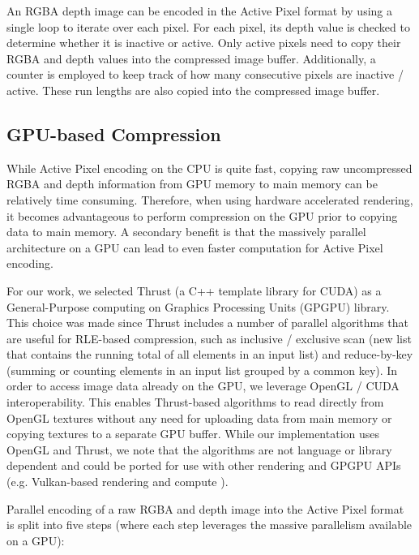 \documentclass{vgtc}                          %
\begin{document}
An RGBA depth image can be encoded in the Active Pixel format by using a single loop to iterate over each pixel. For each pixel, its depth value is checked to determine whether it is inactive or active. Only active pixels need to copy their RGBA and depth values into the compressed image buffer. Additionally, a counter is employed to keep track of how many consecutive pixels are inactive / active. These run lengths are also copied into the compressed image buffer.

\subsection{GPU-based Compression}
While Active Pixel encoding on the CPU is quite fast, copying raw uncompressed RGBA and depth information from GPU memory to main memory can be relatively time consuming. Therefore, when using hardware accelerated rendering, it becomes advantageous to perform compression on the GPU prior to copying data to main memory. A secondary benefit is that the massively parallel architecture on a GPU can lead to even faster computation for Active Pixel encoding.

For our work, we selected Thrust \cite{Thrust} (a C++ template library for CUDA) as a General-Purpose computing on Graphics Processing Units (GPGPU) library. This choice was made since Thrust includes a number of parallel algorithms that are useful for RLE-based compression, such as inclusive / exclusive scan (new list that contains the running total of all elements in an input list) and reduce-by-key (summing or counting elements in an input list grouped by a common key). In order to access image data already on the GPU, we leverage OpenGL / CUDA interoperability. This enables Thrust-based algorithms to read directly from OpenGL textures without any need for uploading data from main memory or copying textures to a separate GPU buffer. While our implementation uses OpenGL and Thrust, we note that the algorithms are not language or library dependent and could be ported for use with other rendering and GPGPU APIs (e.g. Vulkan-based rendering and compute \cite{Vulkan}).

Parallel encoding of a raw RGBA and depth image into the Active Pixel format is split into five steps (where each step leverages the massive parallelism available on a GPU):
\end{document}
